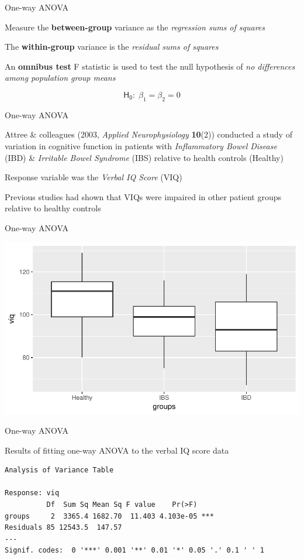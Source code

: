 \documentclass[10pt,ignorenonframetext,compress, aspectratio=169]{beamer}
\begin{document}
\begin{frame}{One-way ANOVA}

Measure the \textbf{between-group} variance as the \emph{regression sums
of squares}

The \textbf{within-group} variance is the \emph{residual sums of
squares}

An \textbf{omnibus test} F statistic is used to test the null hypothesis
of \emph{no differences among population group means}

\[\mathsf{H_0:} \; \beta_1 = \beta_2 = 0\]

\end{frame}

\begin{frame}{One-way ANOVA}

Attree \& colleagues (2003, \emph{Applied Neurophysiology}
\textbf{10}(2)) conducted a study of variation in cognitive function in
patients with \emph{Inflammatory Bowel Disease} (IBD) \& \emph{Irritable
Bowel Syndrome} (IBS) relative to health \alert{controls} (Healthy)

Response variable was the \emph{Verbal IQ Score} (VIQ)

Previous studies had shown that VIQs were impaired in other patient
groups relative to healthy controls

\end{frame}

\begin{frame}{One-way ANOVA}

\begin{center}\includegraphics[width=0.7\linewidth]{03-linear-models_files/figure-beamer/verbal-1-1} \end{center}

\end{frame}

\begin{frame}[fragile]{One-way ANOVA}

Results of fitting one-way ANOVA to the verbal IQ score data

\scriptsize

\begin{verbatim}
Analysis of Variance Table

Response: viq
          Df  Sum Sq Mean Sq F value    Pr(>F)    
groups     2  3365.4 1682.70  11.403 4.103e-05 ***
Residuals 85 12543.5  147.57                      
---
Signif. codes:  0 '***' 0.001 '**' 0.01 '*' 0.05 '.' 0.1 ' ' 1
\end{verbatim}

\normalsize

\end{frame}
\end{document}
